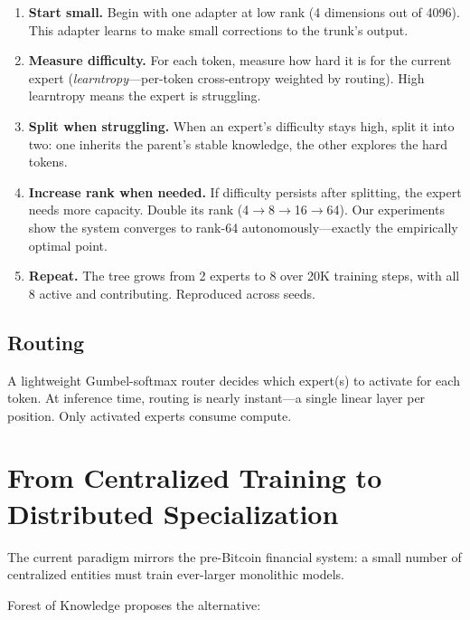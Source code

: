 \documentclass[11pt]{article}
\begin{document}
\begin{enumerate}[nosep]
\item \textbf{Start small.} Begin with one adapter at low rank (4
      dimensions out of 4096). This adapter learns to make small corrections
      to the trunk's output.
\item \textbf{Measure difficulty.} For each token, measure how hard it is
      for the current expert (\emph{learntropy}---per-token cross-entropy
      weighted by routing). High learntropy means the expert is struggling.
\item \textbf{Split when struggling.} When an expert's difficulty stays
      high, split it into two: one inherits the parent's stable knowledge,
      the other explores the hard tokens.
\item \textbf{Increase rank when needed.} If difficulty persists after
      splitting, the expert needs more capacity. Double its rank
      (4$\to$8$\to$16$\to$64). Our experiments show the system converges
      to rank-64 autonomously---exactly the empirically optimal point.
\item \textbf{Repeat.} The tree grows from 2 experts to 8 over 20K training
      steps, with all 8 active and contributing. Reproduced across seeds.
\end{enumerate}

\subsection{Routing}

A lightweight Gumbel-softmax router decides which expert(s) to activate for
each token. At inference time, routing is nearly instant---a single linear
layer per position. Only activated experts consume compute.

\section{From Centralized Training to Distributed Specialization}

The current paradigm mirrors the pre-Bitcoin financial system: a small
number of centralized entities must train ever-larger monolithic models.

Forest of Knowledge proposes the alternative:
\end{document}
